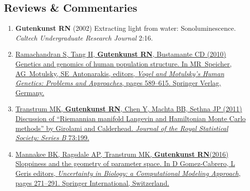 \documentclass[11pt]{article}
\begin{document}
\subsection*{Reviews \& Commentaries}
\begin{enumerate}


\item \textbf{Gutenkunst RN} (2002) {Extracting light from water: Sonoluminescence}.
\newblock \emph{Caltech Undergraduate Research Journal} 2:16.


\item \href{http://doi.org/10.1007/978-3-540-37654-5}{Ramachandran S, Tang H, \textbf{Gutenkunst RN}, Bustamante CD (2010) {Genetics and
  genomics of human population structure}.
\newblock In MR~Speicher, AG~Motulsky, SE~Antonarakis, editors, \emph{Vogel and
  Motulsky's Human Genetics: Problems and Approaches}, pages 589--615. Springer
  Verlag, Germany.}

\item \href{http://doi.org/10.1111/j.1467-9868.2010.00765.x}{\grad Transtrum MK, \textbf{Gutenkunst RN}, Chen Y, Machta BB, Sethna JP
  (2011)
\newblock Discussion of ``{R}iemannian manifold {L}angevin and {H}amiltonian
  {M}onte {C}arlo methods'' by {G}irolami and {C}alderhead.
\newblock \emph{Journal of the Royal Statistical Society: Series B} 73:199.}

\item \href{http://doi.org/10.1007/978-3-319-21296-8_11}{Mannakee BK\trainee, Ragsdale AP\trainee, Transtrum MK, \textbf{Gutenkunst RN}\corresponding (2016) Sloppiness and the geometry of parameter space. In D Gomez-Cabrero, L Geris editors, \textit{Uncertainty in Biology: a Computational Modeling Approach}, pages 271--291. Springer International, Switzerland.}


\end{enumerate}
\end{document}
